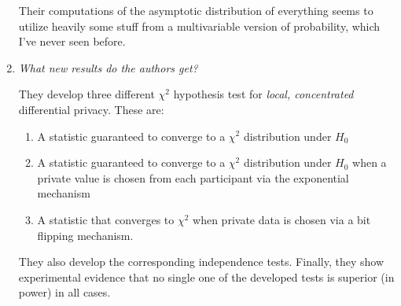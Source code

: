 \documentclass{article}
\begin{document}
\begin{enumerate}
Their computations of the asymptotic distribution of everything seems to utilize heavily some stuff from a multivariable version of probability, which I've never seen before.


\item \emph{What new results do the authors get?}

They develop three different $\chi^2$ hypothesis test for \emph{local, concentrated} differential privacy.
These are:
\begin{enumerate}
\item A statistic guaranteed to converge to a $\chi^2$ distribution under $H_0$
\item A statistic guaranteed to converge to a $\chi^2$ distribution under $H_0$ when a private value is chosen from each participant via the exponential mechanism
\item A statistic that converges to $\chi^2$ when private data is chosen via a bit flipping mechanism.
\end{enumerate}
They also develop the corresponding independence tests.
Finally, they show experimental evidence that no single one of the developed tests is superior (in power) in all cases.

\end{enumerate}
\end{document}
